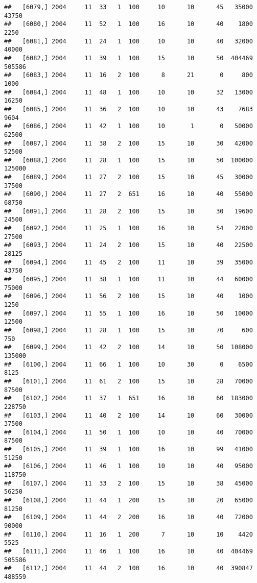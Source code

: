\documentclass{article}\usepackage[]{graphicx}\usepackage[]{color}
\makeatletter
\newenvironment{kframe}{%
 \def\at@end@of@kframe{}%
 \ifinner\ifhmode%
  \def\at@end@of@kframe{\end{minipage}}%
  \begin{minipage}{\columnwidth}%
 \fi\fi%
 \def\FrameCommand##1{\hskip\@totalleftmargin \hskip-\fboxsep
 \colorbox{shadecolor}{##1}\hskip-\fboxsep
     \hskip-\linewidth \hskip-\@totalleftmargin \hskip\columnwidth}%
 \MakeFramed {\advance\hsize-\width
   \@totalleftmargin\z@ \linewidth\hsize
   \@setminipage}}%
 {\par\unskip\endMakeFramed%
 \at@end@of@kframe}
\newenvironment{knitrout}{}{} %
\makeatother
\begin{document}
\begin{knitrout}
\begin{kframe}
\begin{verbatim}
##   [6079,] 2004     11  33   1  100     10      10      45   35000   43750
##   [6080,] 2004     11  52   1  100     16      10      40    1800    2250
##   [6081,] 2004     11  24   1  100     10      10      40   32000   40000
##   [6082,] 2004     11  39   1  100     15      10      50  404469  505586
##   [6083,] 2004     11  16   2  100      8      21       0     800    1000
##   [6084,] 2004     11  48   1  100     10      10      32   13000   16250
##   [6085,] 2004     11  36   2  100     10      10      43    7683    9604
##   [6086,] 2004     11  42   1  100     10       1       0   50000   62500
##   [6087,] 2004     11  38   2  100     15      10      30   42000   52500
##   [6088,] 2004     11  28   1  100     15      10      50  100000  125000
##   [6089,] 2004     11  27   2  100     15      10      45   30000   37500
##   [6090,] 2004     11  27   2  651     16      10      40   55000   68750
##   [6091,] 2004     11  28   2  100     15      10      30   19600   24500
##   [6092,] 2004     11  25   1  100     16      10      54   22000   27500
##   [6093,] 2004     11  24   2  100     15      10      40   22500   28125
##   [6094,] 2004     11  45   2  100     11      10      39   35000   43750
##   [6095,] 2004     11  38   1  100     11      10      44   60000   75000
##   [6096,] 2004     11  56   2  100     15      10      40    1000    1250
##   [6097,] 2004     11  55   1  100     16      10      50   10000   12500
##   [6098,] 2004     11  28   1  100     15      10      70     600     750
##   [6099,] 2004     11  42   2  100     14      10      50  108000  135000
##   [6100,] 2004     11  66   1  100     10      30       0    6500    8125
##   [6101,] 2004     11  61   2  100     15      10      28   70000   87500
##   [6102,] 2004     11  37   1  651     16      10      60  183000  228750
##   [6103,] 2004     11  40   2  100     14      10      60   30000   37500
##   [6104,] 2004     11  50   1  100     10      10      40   70000   87500
##   [6105,] 2004     11  39   1  100     16      10      99   41000   51250
##   [6106,] 2004     11  46   1  100     10      10      40   95000  118750
##   [6107,] 2004     11  33   2  100     15      10      38   45000   56250
##   [6108,] 2004     11  44   1  200     15      10      20   65000   81250
##   [6109,] 2004     11  44   2  200     16      10      40   72000   90000
##   [6110,] 2004     11  16   1  200      7      10      10    4420    5525
##   [6111,] 2004     11  46   1  100     16      10      40  404469  505586
##   [6112,] 2004     11  44   2  100     16      10      40  390847  488559

\end{verbatim}
\end{kframe}
\end{knitrout}
\end{document}
